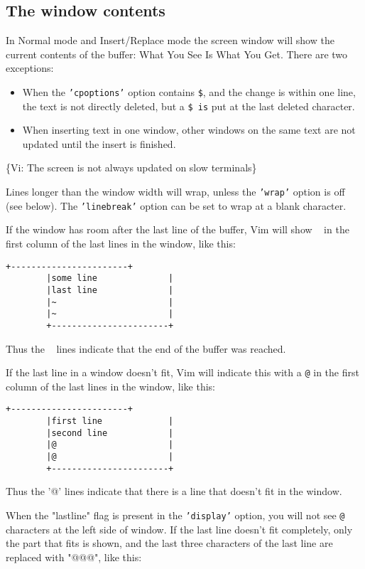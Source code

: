 \subsection{The window contents}
\label{window-contents}
In Normal mode and Insert/Replace mode the screen window will show the current contents of the buffer: What You See Is What You Get.
There are two exceptions:
\begin{itemize}
				\item When the \texttt{'cpoptions'} option contains \texttt{\$},  and the change is within one line, the text is not directly deleted, but a \texttt{\$ is} put at the last deleted character.
				\item When inserting text in one window, other windows on the same text are not updated until the insert is finished.
\end{itemize}
\{Vi: The screen is not always updated on slow terminals\}

Lines longer than the window width will wrap, unless the \texttt{'wrap'} option is off (see below).
The \texttt{'linebreak'} option can be set to wrap at a blank character.

If the window has room after the last line of the buffer, Vim will show \texttt{~} in the first column of the last lines in the window, like this:
\begin{Verbatim}[samepage=true]
		+-----------------------+
		|some line              |
		|last line              |
		|~                      |
		|~                      |
		+-----------------------+
\end{Verbatim}

Thus the \texttt{~} lines indicate that the end of the buffer was reached.

If the last line in a window doesn't fit, Vim will indicate this with a \texttt{@} in the first column of the last lines in the window, like this:

\begin{Verbatim}[samepage=true]
		+-----------------------+
		|first line             |
		|second line            |
		|@                      |
		|@                      |
		+-----------------------+
\end{Verbatim}

Thus the '@' lines indicate that there is a line that doesn't fit in the window.

When the "lastline" flag is present in the \texttt{'display'} option, you will not see \texttt{@} characters at the left side of window.
If the last line doesn't fit completely, only the part that fits is shown, and the last three characters of the last line are replaced with "@@@", like this:

